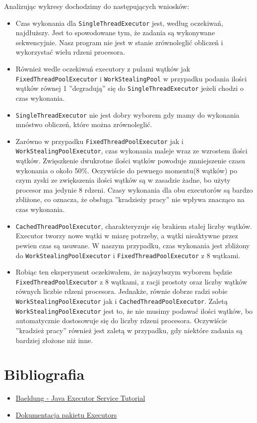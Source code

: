 \documentclass[11pt]{article}
\begin{document}
Analizując wykresy dochodzimy do następujących wniosków:
\begin{itemize}
\item Czas wykonania dla \texttt{SingleThreadExecutor} jest, według oczekiwań,
najdłuższy. Jest to spowodowane tym, że zadania są wykonywane sekwencyjnie.
Nasz program nie jest w stanie zrównoleglić obliczeń i wykorzystać
wielu rdzeni procesora.
\item Również wedle oczekiwań executory z pulami wątków jak \texttt{FixedThreadPoolExecutor} i
\texttt{WorkStealingPool} w przypadku podania ilości wątków równej 1 ''degradują'' się
 do \texttt{SingleThreadExecutor} jeżeli chodzi o czas wykonania.
\item \texttt{SingleThreadExecutor} nie jest dobry wyborem gdy mamy do wykonania
mnóstwo obliczeń, które można zrównoleglić.
\item Zarówno w przypadku \texttt{FixedThreadPoolExecutor} jak i \texttt{WorkStealingPoolExecutor},
czas wykonania maleje wraz ze wzrostem ilości wątków. Zwięszkenie
dwukrotne ilości wątków powoduje zmniejszenie czasu wykonania o około 50\%.
Oczywiście do pewnego momentu(8 wątków) po czym zyski ze zwiększenia ilości
wątków są w zasadzie żadne, bo użyty procesor
ma jedynie 8 rdzeni. Czasy wykonania dla obu executorów są bardzo zbliżone,
co oznacza, że obsługa ''kradzieży pracy'' nie wpływa znacząco na czas wykonania.
\item \texttt{CachedThreadPoolExecutor}, charakteryzuje się brakiem stałej liczby wątków.
Executor tworzy nowe wątki w miarę potrzeby, a wątki nieaktywne przez pewien
czas są usuwane. W naszym przypadku, czas wykonania jest zbliżony do
\texttt{WorkStealingPoolExecutor} i \texttt{FixedThreadPoolExecutor} z 8 wątkami.
\item Robiąc ten eksperyment oczekiwałem, że najszybszym wyborem będzie
\texttt{FixedThreadPoolExecutor} z 8 wątkami, z racji prostoty oraz
liczby wątków równych liczbie rdzeni procesora. Jednakże, równie
dobrze radzi sobie \texttt{WorkStealingPoolExecutor} jak i \texttt{CachedThreadPoolExecutor}.
Zaletą \texttt{WorkStealingPoolExecutor} jest to, że nie musimy podawać ilości wątków,
bo automatycznie dostosowuje się do liczby rdzeni procesora.
Oczywiście ''kradzież pracy'' również jest zaletą w przypadku, gdy
niektóre zadania są bardziej złożone niż inne.
\end{itemize}
\section*{Bibliografia}
\label{sec:orgf69cdeb}
\begin{itemize}
\item \href{https://www.baeldung.com/java-executor-service-tutorial}{Baeldung - Java Executor Service Tutorial}
\item \href{https://docs.oracle.com/javase/8/docs/api/?java/util/concurrent/Executors.html}{Dokumentacja pakietu Executors}
\end{itemize}
\end{document}
